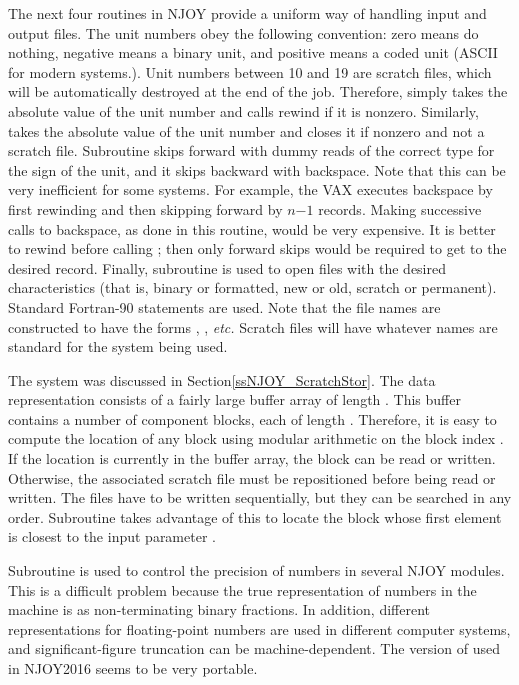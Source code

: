 The next four routines in NJOY provide a uniform way of handling
input and output files.  The unit numbers obey the following
convention: zero means do nothing, negative means a binary unit,
and positive means a coded unit (ASCII for modern systems.).
Unit numbers between 10 and 19 are scratch files, which will be
automatically destroyed at the end of the job.  Therefore,
 simply takes the absolute value of the unit number
and calls rewind if it is nonzero.  Similarly, 
takes the absolute value of the unit number and closes it if
nonzero and not a scratch file.  Subroutine  skips
forward with dummy reads of the correct type for the sign of the
unit, and it skips backward with backspace.  Note that this can
be very inefficient for some systems.  For example, the VAX
executes backspace by first rewinding and then skipping forward
by $n{-1}$ records.  Making successive calls to backspace, as done
in this routine, would be very expensive.  It is better to rewind
before calling ; then only forward skips would be
required to get to the desired record.  Finally, subroutine
 is used to open files with the desired characteristics
(that is, binary or formatted, new or old, scratch or permanent).
Standard Fortran-90 statements are used.  Note that the file names
are constructed to have the forms , ,
{\it etc.}  Scratch files will have whatever names are standard
for the system being used.

The  system was discussed in
Section\ref{ssNJOY_ScratchStor}.
The data representation consists of a fairly large buffer array
 of length .  This buffer contains a
number of component blocks, each of length .
Therefore, it is easy to compute the location of any block using
modular arithmetic on the block index .  If the location
is currently in the buffer array, the block can be read or
written.  Otherwise, the associated scratch file 
must be repositioned before being read or written.  The files
 have to be written sequentially, but they can be
searched in any order.  Subroutine  takes advantage
of this to locate the block whose first element is closest to the
input parameter .

Subroutine  is used to control the precision of
numbers in several NJOY modules.  This is a difficult problem
because the true representation of numbers in the machine is as
non-terminating binary fractions.  In addition, different
representations for floating-point numbers are used in different
computer systems, and significant-figure truncation can be
machine-dependent.  The version of  used in NJOY2016
seems to be very portable.

